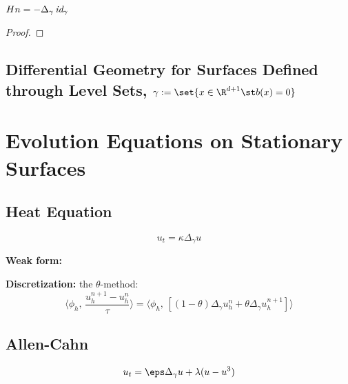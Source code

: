 \documentclass[10pt]{article}
\begin{document}
\begin{theorem}{ $Hn = - \Delta_{\gamma}\, \emph{id}_\gamma$ }
   \label{thm:vector_mean_curvature}
\end{theorem}

\begin{proof}
\end{proof}

\subsection{Differential Geometry for Surfaces Defined through Level Sets,
   $\gamma := \set{x \in \R^{d+1} \st b(x) = 0}$}



\section{Evolution Equations on Stationary Surfaces}


\subsection{Heat Equation}

\begin{equation}
   u_t = \kappa \Delta_{\gamma} u
   \label{eqn:heat}
\end{equation}

{\bf Weak form:} 

{\bf Discretization:} the $\theta$-method: 
\begin{equation}
   \langle \phi_h, \, \frac{u_h^{n+1} - u_h^n}{\tau} \rangle = \langle \phi_h,
   \, \left[ (1 - \theta)\Delta_\gamma u_h^{n} + \theta
   \Delta_{\gamma} u_h^{n+1}\right]\rangle
   \label{disc:heat_theta}
\end{equation}




\subsection{Allen-Cahn}

\begin{equation}
u_t = \eps \Delta_{\gamma} u + \lambda (u - u^3)
   \label{eqn:heat}
\end{equation}




\end{document}
